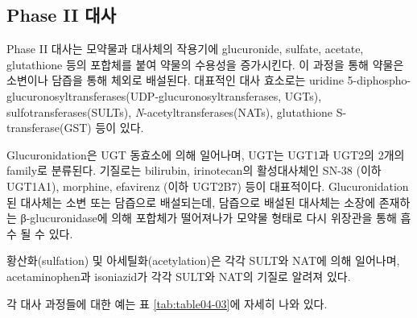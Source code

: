 \documentclass[
  11pt,
  krantz2, a4paper, twoside]{krantz}
\begin{document}
\hypertarget{phase-ii-uxb300uxc0ac}{%
\subsection{Phase II 대사}\label{phase-ii-uxb300uxc0ac}}

Phase II 대사는 모약물과 대사체의 작용기에 glucuronide, sulfate,
acetate, glutathione 등의 포합체를 붙여 약물의 수용성을 증가시킨다. 이
과정을 통해 약물은 소변이나 담즙을 통해 체외로 배설된다. 대표적인 대사
효소로는 uridine 5\textquotesingle-diphospho-glucuronosyltransferases(UDP-glucuronosyltransferases, UGTs), sulfotransferases(SULTs),
\emph{N}-acetyltransferases(NATs), glutathione S-transferase(GST) 등이
있다.

Glucuronidation은 UGT 동효소에 의해 일어나며, UGT는 UGT1과
UGT2의 2개의 family로 분류된다. 기질로는 bilirubin, irinotecan의
활성대사체인 SN-38 (이하 UGT1A1), morphine, efavirenz (이하 UGT2B7) 등이
대표적이다. Glucuronidation된 대사체는 소변 또는 담즙으로 배설되는데,
담즙으로 배설된 대사체는 소장에 존재하는 β-glucuronidase에 의해 포합체가
떨어져나가 모약물 형태로 다시 위장관을 통해 흡수 될 수 있다.

황산화(sulfation) 및 아세틸화(acetylation)은 각각 SULT와 NAT에 의해
일어나며, acetaminophen과 isoniazid가 각각 SULT와 NAT의 기질로 알려져
있다.

각 대사 과정들에 대한 예는 표 \ref{tab:table04-03}에 자세히 나와 있다.
\end{document}
